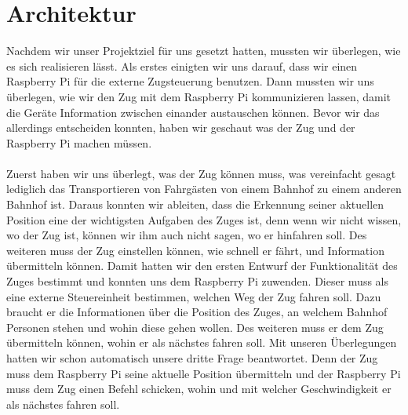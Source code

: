 \chapter{Architektur}
Nachdem wir unser Projektziel für uns gesetzt hatten, mussten wir überlegen, wie es sich realisieren lässt. Als erstes einigten wir uns darauf, dass wir einen Raspberry Pi für die externe Zugsteuerung benutzen. Dann mussten wir uns überlegen, wie wir den Zug mit dem Raspberry Pi kommunizieren lassen, damit die Geräte Information zwischen einander austauschen können. Bevor wir das allerdings entscheiden konnten, haben wir geschaut was der Zug und der Raspberry Pi machen müssen.\\
\\
Zuerst haben wir uns überlegt, was der Zug können muss, was vereinfacht gesagt lediglich das Transportieren von Fahrgästen von einem Bahnhof zu einem anderen Bahnhof ist. Daraus konnten wir ableiten, dass die Erkennung seiner aktuellen Position eine der wichtigsten Aufgaben des Zuges ist, denn wenn wir nicht wissen, wo der Zug ist, können wir ihm auch nicht sagen, wo er hinfahren soll. Des weiteren muss der Zug einstellen können, wie schnell er fährt, und Information übermitteln können. Damit hatten wir den ersten Entwurf der Funktionalität des Zuges bestimmt und konnten uns dem Raspberry Pi zuwenden. Dieser muss als eine externe Steuereinheit bestimmen, welchen Weg der Zug fahren soll. Dazu braucht er die Informationen über die Position des Zuges, an welchem Bahnhof Personen stehen und wohin diese gehen wollen. Des weiteren muss er dem Zug übermitteln können, wohin er als nächstes fahren soll. Mit unseren Überlegungen hatten wir schon automatisch unsere dritte Frage beantwortet. Denn der Zug muss dem Raspberry Pi seine aktuelle Position übermitteln und der Raspberry Pi muss dem Zug einen Befehl schicken, wohin und mit welcher Geschwindigkeit er als nächstes fahren soll. \\
\\
